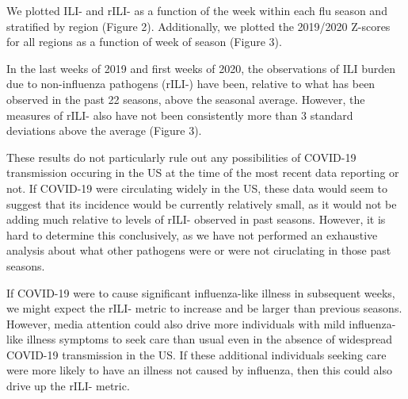 \documentclass[]{article}
\begin{document}
We plotted ILI- and rILI- as a function of the week within each flu
season and stratified by region (Figure 2). Additionally, we plotted the
2019/2020 Z-scores for all regions as a function of week of season
(Figure 3).

In the last weeks of 2019 and first weeks of 2020, the observations of
ILI burden due to non-influenza pathogens (rILI-) have been, relative to
what has been observed in the past 22 seasons, above the seasonal
average. However, the measures of rILI- also have not been consistently
more than 3 standard deviations above the average (Figure 3).

These results do not particularly rule out any possibilities of COVID-19
transmission occuring in the US at the time of the most recent data
reporting or not. If COVID-19 were circulating widely in the US, these
data would seem to suggest that its incidence would be currently
relatively small, as it would not be adding much relative to levels of
rILI- observed in past seasons. However, it is hard to determine this
conclusively, as we have not performed an exhaustive analysis about what
other pathogens were or were not ciruclating in those past seasons.

If COVID-19 were to cause significant influenza-like illness in
subsequent weeks, we might expect the rILI- metric to increase and be
larger than previous seasons. However, media attention could also drive
more individuals with mild influenza-like illness symptoms to seek care
than usual even in the absence of widespread COVID-19 transmission in
the US. If these additional individuals seeking care were more likely to
have an illness not caused by influenza, then this could also drive up
the rILI- metric.
\end{document}
